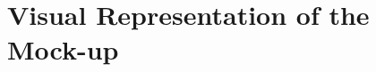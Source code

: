 \documentclass[a4paper]{article}
\begin{document}
\section*{Visual Representation of the Mock-up}

\end{document}
